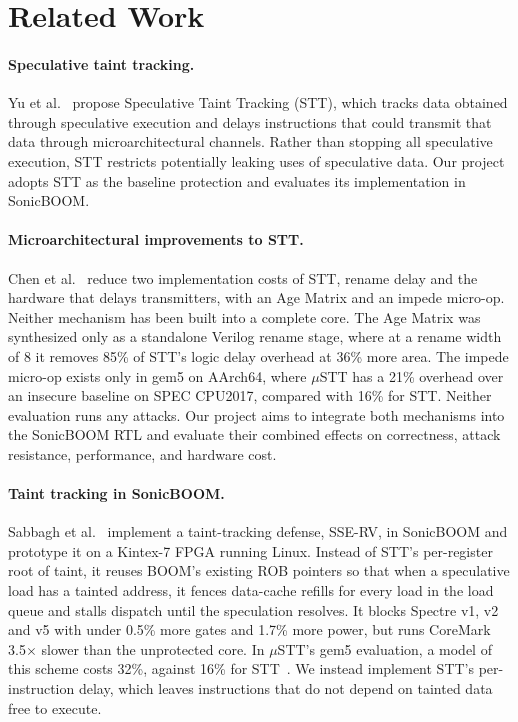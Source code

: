 \section{Related Work}
\label{sec:related_work}


\paragraph{Speculative taint tracking.}
Yu et al.~\cite{Yu:STT:2019} propose Speculative Taint
Tracking (STT), which tracks data obtained through
speculative execution and delays instructions that could
transmit that data through microarchitectural channels.
Rather than stopping all speculative execution, STT
restricts potentially leaking uses of speculative data.
Our project adopts STT as the baseline protection and
evaluates its implementation in SonicBOOM.

\paragraph{Microarchitectural improvements to STT.}
Chen et al.~\cite{Chen:uSTT:2025} reduce two implementation
costs of STT, rename delay and the hardware that delays
transmitters, with an Age Matrix and an impede micro-op.
Neither mechanism has been built into a complete core.
The Age Matrix was synthesized only as a standalone Verilog
rename stage, where at a rename width of 8 it removes 85\%
of STT's logic delay overhead at 36\% more area. The impede
micro-op exists only in gem5 on AArch64, where $\mu$STT has
a 21\% overhead over an insecure baseline on SPEC CPU2017,
compared with 16\% for STT. Neither evaluation runs any
attacks.
Our project aims to integrate both mechanisms into the
SonicBOOM RTL and evaluate their combined effects on
correctness, attack resistance, performance, and hardware
cost.

\paragraph{Taint tracking in SonicBOOM.}
Sabbagh et al.~\cite{sabbagh2021secure} implement a
taint-tracking defense, SSE-RV, in SonicBOOM and prototype
it on a Kintex-7 FPGA running Linux. Instead of STT's
per-register root of taint, it reuses BOOM's existing ROB
pointers so that when a speculative load has a tainted address, it
fences data-cache refills for every load in the load queue
and stalls dispatch until the speculation resolves. It
blocks Spectre v1, v2 and v5 with under 0.5\% more gates and
1.7\% more power, but runs CoreMark 3.5$\times$ slower than
the unprotected core. In $\mu$STT's gem5 evaluation, a model
of this scheme costs 32\%, against 16\% for
STT~\cite{Chen:uSTT:2025}. We instead implement STT's
per-instruction delay, which leaves instructions that do
not depend on tainted data free to execute.

